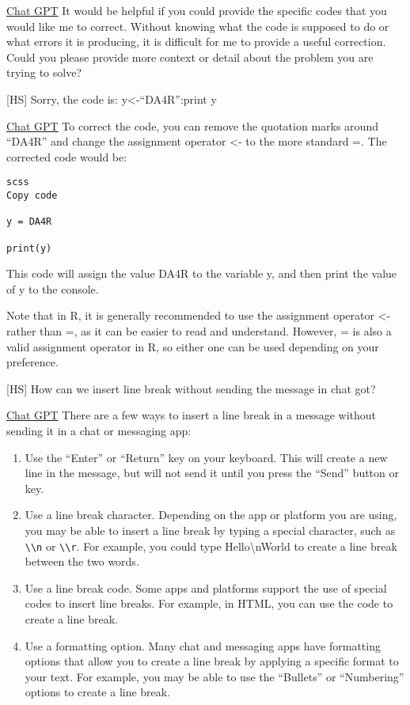 \documentclass[
]{book}
\providecommand{\tightlist}{%
  \setlength{\itemsep}{0pt}\setlength{\parskip}{0pt}}
\theoremstyle{definition}
\theoremstyle{definition}
\theoremstyle{definition}
\theoremstyle{definition}
\theoremstyle{remark}
\begin{document}
\protect\hyperlink{chatgpt}{Chat GPT} It would be helpful if you could provide the specific codes that you would like me to correct. Without knowing what the code is supposed to do or what errors it is producing, it is difficult for me to provide a useful correction. Could you please provide more context or detail about the problem you are trying to solve?

{[}HS{]} Sorry, the code is: y\textless-``DA4R'':print y

\protect\hyperlink{chatgpt}{Chat GPT} To correct the code, you can remove the quotation marks around ``DA4R'' and change the assignment operator \textless- to the more standard =. The corrected code would be:

\begin{verbatim}
scss
Copy code

y = DA4R

print(y)
\end{verbatim}

This code will assign the value DA4R to the variable y, and then print the value of y to the console.

Note that in R, it is generally recommended to use the assignment operator \textless- rather than =, as it can be easier to read and understand. However, = is also a valid assignment operator in R, so either one can be used depending on your preference.

{[}HS{]} How can we insert line break without sending the message in chat got?

\protect\hyperlink{chatgpt}{Chat GPT} There are a few ways to insert a line break in a message without sending it in a chat or messaging app:

\begin{enumerate}
\def\labelenumi{\arabic{enumi}.}
\tightlist
\item
  Use the ``Enter'' or ``Return'' key on your keyboard. This will create a new line in the message, but will not send it until you press the ``Send'' button or key.
\item
  Use a line break character. Depending on the app or platform you are using, you may be able to insert a line break by typing a special character, such as \texttt{\textbackslash{}\textbackslash{}n} or \texttt{\textbackslash{}\textbackslash{}r}. For example, you could type Hello\textbackslash nWorld to create a line break between the two words.
\item
  Use a line break code. Some apps and platforms support the use of special codes to insert line breaks. For example, in HTML, you can use the code to create a line break.
\item
  Use a formatting option. Many chat and messaging apps have formatting options that allow you to create a line break by applying a specific format to your text. For example, you may be able to use the ``Bullets'' or ``Numbering'' options to create a line break.
\end{enumerate}
\end{document}
